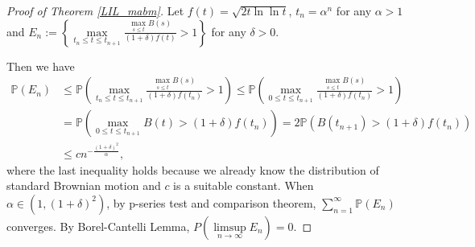 \documentclass[main.tex]{subfiles}
\begin{document}
\begin{proof}[Proof of Theorem \ref{LIL_mabm}]
Let $f(t) = \sqrt{2t\ln\ln t}$, $t_n=\alpha^n$ for any $\alpha>1$ and $E_n:=\left\{\max\limits_{t_n\leqslant t\leqslant t_{n+1}}\frac{\max\limits_{s\leqslant t}B(s)}{(1+\delta) f(t)}>1\right\}$ for any $\delta>0$.

Then we have
\begin{align*}
	\mathbb{P}(E_n) &\leqslant \mathbb{P}\left(\max\limits_{t_n\leqslant t\leqslant t_{n+1}}\frac{\max\limits_{s\leqslant t}B(s)}{(1+\delta) f(t_n)}>1\right)
	\leqslant\mathbb{P}\left(\max\limits_{0\leqslant t\leqslant t_{n+1}}\frac{\max\limits_{s\leqslant t}B(s)}{(1+\delta) f(t_n)}>1\right)\\
	&=\mathbb{P}\left(\max\limits_{0\leqslant t\leqslant t_{n+1}}B(t)>(1+\delta) f(t_n)\right)
	=2\mathbb{P}\left(B(t_{n+1})>(1+\delta) f(t_n)\right)\\
	&\leqslant cn^{-\frac{(1+\delta)^2}{\alpha}},
\end{align*}
where the last inequality holds because we already know the distribution of standard Brownian motion and $c$ is a suitable constant. When $\alpha\in(1,(1+\delta)^2)$, by p-series test and comparison theorem, $\sum_{n=1}^\infty\mathbb{P}(E_n)$ converges. By Borel-Cantelli Lemma, $P(\limsup\limits_{n\to\infty}E_n)=0$.


\end{proof}
\end{document}
